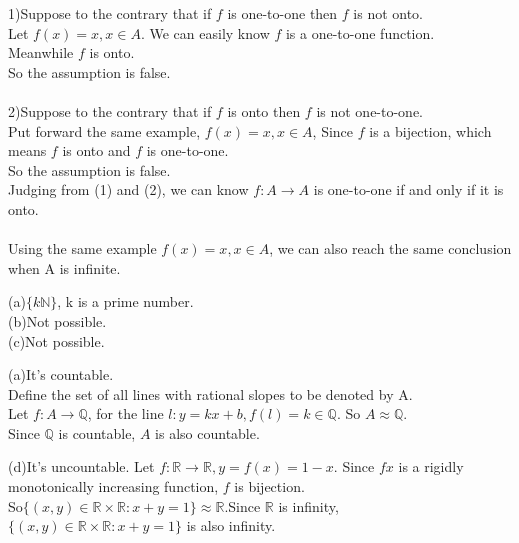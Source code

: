 \documentclass[a4paper, justified]{tufte-handout}
\begin{document}
\begin{problem}[UD Problem 22.21]
\end{problem}

\begin{solution}
  1)Suppose to the contrary that if $f$ is one-to-one then $f$ is not onto.\\
  Let $f(x) = x, x\in A$. We can easily know $f$ is a one-to-one function.\\
  Meanwhile $f$ is onto.\\
  So the assumption is false.\\
  \\
  2)Suppose to the contrary that if $f$ is onto then $f$ is not one-to-one.\\
  Put forward the same example, $f(x) = x, x\in A$, Since $f$ is a bijection, which means $f$ is onto and $f$ is one-to-one.\\
  So the assumption is false.\\
  Judging from (1) and (2),  we can know $f:A\rightarrow A$ is one-to-one if and only if it is onto.\\
  \\
  Using the same example $f(x) = x, x\in A$, we can also reach the same conclusion when A is infinite.\\
\end{solution}

\begin{problem}[UD Problem 23.1]
\end{problem}

\begin{solution}
  (a)$\{k\mathbb{N} \}$, k is a prime number.\\
  (b)Not possible.\\
  (c)Not possible.\\

\end{solution}

\begin{problem}[UD Problem 23.3 (a, d)]
\end{problem}

\begin{solution}
  (a)It's countable.\\
  Define the set of all lines with rational slopes to be denoted by A.\\
  Let $f:A \rightarrow \mathbb{Q} $, for the line $l:y = kx + b,f(l) = k \in \mathbb{Q}$. So $A \approx \mathbb{Q}$.\\
  Since $\mathbb{Q}$ is countable, $A$ is also countable.

  (d)It's uncountable. Let $f:\mathbb{R} \rightarrow \mathbb{R}, y = f(x) = 1 - x$. Since $f{x}$ is a rigidly monotonically increasing function, $f$ is bijection.\\
  So$\{(x,y)\in \mathbb{R} \times \mathbb{R} :x + y = 1\} \approx \mathbb{R}$.Since $\mathbb{R}$ is infinity, $\{(x,y)\in \mathbb{R} \times \mathbb{R} :x + y = 1\}$ is also infinity.
\end{solution}
\end{document}
